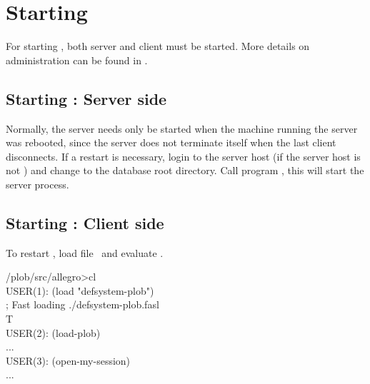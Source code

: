 \section[Starting PLOB]%
{Starting \protect\plob}

For starting \plob, both server and client must be started. More
details on administration can be found in \cite{bib:PLOB-UsersGuide}.

\subsection[Server side]%
{Starting \protect\plob: Server side}

Normally, the server needs only be started when the machine running
the server was rebooted, since the server does not terminate itself
when the last client disconnects.  If a restart is necessary, login to
the server host (if the server host is not ) and
change to the database root directory. Call program , this will start the server process.

\subsection[Client side]%
{Starting \protect\plob: Client side}

\noindent To restart \plob, load file \ and evaluate
.\\[\smallskipamount]
\begin{tt}\CodeSize
\td/plob/src/allegro>cl\\
USER(1): (load "defsystem-plob")\\
; Fast loading ./defsystem-plob.fasl\\
T\\
USER(2): (load-plob)\\
...\\
USER(3): (open-my-session)\\
...\\
\end{tt}





